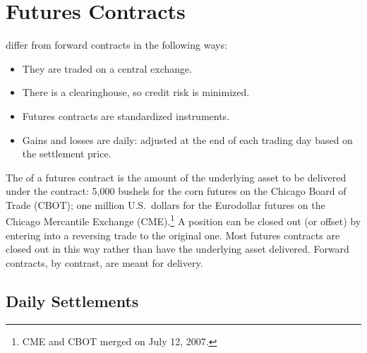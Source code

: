 \suppend

\section{Futures Contracts}
\label{sec:futures}


 differ from forward contracts in the following ways:
\begin{itemize}[nosep]
	\item They are traded on a central exchange.
	\item There is a clearinghouse, so credit risk is minimized.
	\item Futures contracts are standardized instruments.
	\item Gains and losses are  daily: adjusted at the end of each trading day based on the settlement price.
\end{itemize}

\suppstart
{}
\suppend

The  of a futures contract is the amount of the underlying asset to be delivered under the contract: 5,000 bushels for the corn futures on the Chicago Board of Trade (CBOT); one million U.S.\ dollars for the Eurodollar futures on the Chicago Mercantile Exchange (CME).\footnote{CME and CBOT merged on July 12, 2007.}
A position can be closed out (or offset) by entering into a reversing trade to the original one.
Most futures contracts are closed out in this way rather than have the underlying asset delivered.
Forward contracts, by contrast, are meant for delivery.

\suppstart
{}
\suppend

\subsection{Daily Settlements}


